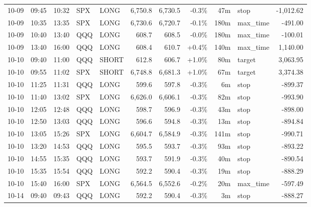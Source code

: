 \documentclass[11pt,a4paper,twoside]{article}
\begin{document}
\begin{center}
\begin{longtable}{>{\color{txtmain}}l l l l l r r r r >{\color{txtmain}}l r}
10-09 & 09:45 & 10:32 & SPX & LONG & 6,750.8 & 6,730.5 & \textcolor{lossred}{-0.3\%} & 47m & stop & \textcolor{lossred}{-1,012.62} \\
10-09 & 10:35 & 13:35 & SPX & LONG & 6,730.6 & 6,720.7 & \textcolor{lossred}{-0.1\%} & 180m & max\_time & \textcolor{lossred}{-491.00} \\
10-09 & 10:40 & 13:40 & QQQ & LONG & 608.7 & 608.5 & \textcolor{lossred}{-0.0\%} & 180m & max\_time & \textcolor{lossred}{-100.01} \\
10-09 & 13:40 & 16:00 & QQQ & LONG & 608.4 & 610.7 & \textcolor{wingreen}{+0.4\%} & 140m & max\_time & \textcolor{wingreen}{1,140.00} \\
10-10 & 09:40 & 11:00 & QQQ & SHORT & 612.8 & 606.7 & \textcolor{wingreen}{+1.0\%} & 80m & target & \textcolor{wingreen}{3,063.95} \\
10-10 & 09:55 & 11:02 & SPX & SHORT & 6,748.8 & 6,681.3 & \textcolor{wingreen}{+1.0\%} & 67m & target & \textcolor{wingreen}{3,374.38} \\
10-10 & 11:25 & 11:31 & QQQ & LONG & 599.6 & 597.8 & \textcolor{lossred}{-0.3\%} & 6m & stop & \textcolor{lossred}{-899.37} \\
10-10 & 11:40 & 13:02 & SPX & LONG & 6,626.0 & 6,606.1 & \textcolor{lossred}{-0.3\%} & 82m & stop & \textcolor{lossred}{-993.90} \\
10-10 & 12:05 & 12:48 & QQQ & LONG & 598.7 & 596.9 & \textcolor{lossred}{-0.3\%} & 43m & stop & \textcolor{lossred}{-898.00} \\
10-10 & 12:50 & 13:03 & QQQ & LONG & 596.6 & 594.8 & \textcolor{lossred}{-0.3\%} & 13m & stop & \textcolor{lossred}{-894.84} \\
10-10 & 13:05 & 15:26 & SPX & LONG & 6,604.7 & 6,584.9 & \textcolor{lossred}{-0.3\%} & 141m & stop & \textcolor{lossred}{-990.71} \\
10-10 & 13:20 & 14:53 & QQQ & LONG & 595.5 & 593.7 & \textcolor{lossred}{-0.3\%} & 93m & stop & \textcolor{lossred}{-893.22} \\
10-10 & 14:55 & 15:35 & QQQ & LONG & 593.7 & 591.9 & \textcolor{lossred}{-0.3\%} & 40m & stop & \textcolor{lossred}{-890.54} \\
10-10 & 15:35 & 15:54 & QQQ & LONG & 592.2 & 590.4 & \textcolor{lossred}{-0.3\%} & 19m & stop & \textcolor{lossred}{-888.29} \\
10-10 & 15:40 & 16:00 & SPX & LONG & 6,564.5 & 6,552.6 & \textcolor{lossred}{-0.2\%} & 20m & max\_time & \textcolor{lossred}{-597.49} \\
10-14 & 09:40 & 09:43 & QQQ & LONG & 592.2 & 590.4 & \textcolor{lossred}{-0.3\%} & 3m & stop & \textcolor{lossred}{-888.27} \\

\end{longtable}
\end{center}
\end{document}
